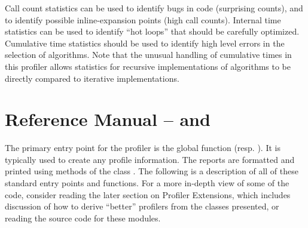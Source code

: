 Call count statistics can be used to identify bugs in code (surprising
counts), and to identify possible inline-expansion points (high call
counts).  Internal time statistics can be used to identify ``hot
loops'' that should be carefully optimized.  Cumulative time
statistics should be used to identify high level errors in the
selection of algorithms.  Note that the unusual handling of cumulative
times in this profiler allows statistics for recursive implementations
of algorithms to be directly compared to iterative implementations.


\section{Reference Manual --  and }




The primary entry point for the profiler is the global function
 (resp. ).
It is typically used to create any profile
information.  The reports are formatted and printed using methods of
the class .  The following is a description of all
of these standard entry points and functions.  For a more in-depth
view of some of the code, consider reading the later section on
Profiler Extensions, which includes discussion of how to derive
``better'' profilers from the classes presented, or reading the source
code for these modules.

